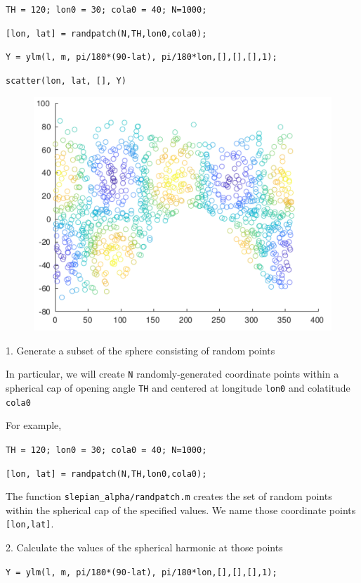 \documentclass{article}
\begin{document}
\verb+TH = 120; lon0 = 30; cola0 = 40; N=1000;+

\verb+[lon, lat] = randpatch(N,TH,lon0,cola0);+

\verb+Y = ylm(l, m, pi/180*(90-lat), pi/180*lon,[],[],[],1);+

\verb+scatter(lon, lat, [], Y)+

\begin{figure}[H]
\includegraphics[scale=.75]{random_plot}
\end{figure}

\setlength{\parskip}{0.5cm plus4mm minus3mm}

1. Generate a subset of the sphere consisting of random points 

In particular, we will create \verb+N+ randomly-generated coordinate points within a spherical cap of opening angle \verb+TH+ and centered at longitude \verb+lon0+ and colatitude \verb+cola0+

For example, 

\verb+TH = 120; lon0 = 30; cola0 = 40; N=1000;+

\verb+[lon, lat] = randpatch(N,TH,lon0,cola0);+

The function \verb+slepian_alpha/randpatch.m+ creates the set of random points within the spherical cap of the specified values. We name those coordinate points \verb+[lon,lat]+.

2. Calculate the values of the spherical harmonic at those points

\verb+Y = ylm(l, m, pi/180*(90-lat), pi/180*lon,[],[],[],1);+
\end{document}
